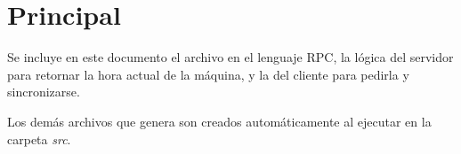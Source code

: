 \section{Principal}

Se incluye en este documento el archivo en el lenguaje RPC, la lógica del
servidor para retornar la hora actual de la máquina, y la del cliente para
pedirla y sincronizarse.

Los demás archivos que genera  son creados automáticamente al
ejecutar  en la carpeta \emph{src}.





